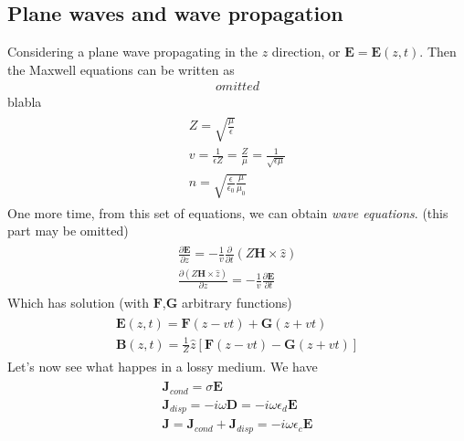 \documentclass[a4paper, twocolumn]{article}
\begin{document}
\subsection{Plane waves and wave propagation}
\label{sec:plane-waves-wave}

Considering a plane wave propagating in the $z$ direction, or $\mathbf{E}=\mathbf{E}(z,t)$. Then the Maxwell equations can be written as
\begin{align}
  \label{eq:46}
  omitted
\end{align}
blabla
\begin{gather}
  \label{eq:49}
  \begin{aligned}
    Z=\sqrt{\frac{\mu}{\epsilon}} \\
    v=\frac{1}{\epsilon Z}=\frac{Z}{\mu}=\frac{1}{\sqrt{\epsilon\mu}} \\
    n=\sqrt{\frac{\epsilon}{\epsilon_0}\frac{\mu}{\mu_0}}
  \end{aligned}
\end{gather}
One more time, from this set of equations, we can obtain \emph{wave equations}. (this part may be omitted)
\begin{gather}
  \label{eq:50}
  \begin{aligned}
    \frac{\partial \mathbf{E}}{\partial z}=-\frac{1}{v}\frac{\partial}{\partial t}(Z\mathbf{H}\times\hat{z}) \\
    \frac{\partial (Z\mathbf{H}\times\hat{z})}{\partial z}=-\frac{1}{v}  \frac{\partial \mathbf{E}}{\partial t} 
  \end{aligned}
\end{gather}
Which has solution (with $\mathbf{F}$,$\mathbf{G}$ arbitrary functions)
\begin{gather}
  \label{eq:52}
  \begin{aligned}
    \mathbf{E}(z,t)=\mathbf{F}(z-vt)+\mathbf{G}(z+vt) \\
    \mathbf{B}(z,t)=\frac{1}{Z}\hat{z}\left[\mathbf{F}(z-vt)-\mathbf{G}(z+vt)\right]
  \end{aligned}
\end{gather}
Let's now see what happes in a lossy medium. We have
\begin{gather}
  \label{eq:53}
  \begin{split}
    \mathbf{J}_{cond}=\sigma\mathbf{E} \qquad \\
    \mathbf{J}_{disp}=-i \omega\mathbf{D}=-i\omega\epsilon_d\mathbf{E}  \\
    \mathbf{J}=\mathbf{J}_{cond}+\mathbf{J}_{disp}=-i\omega\epsilon_c\mathbf{E}
  \end{split}
\end{gather}
\end{document}
